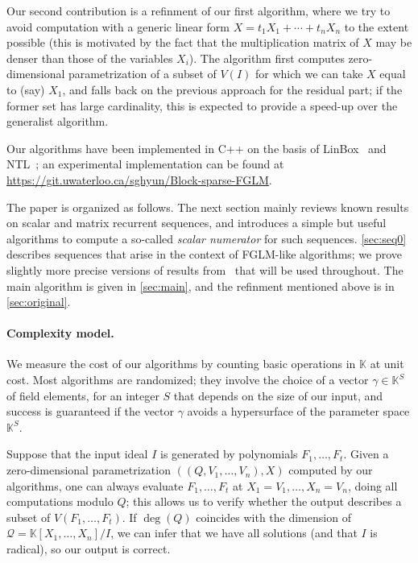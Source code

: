 \documentclass[12pt]{article}
\newcommand{\lf}{X}
\newcommand{\residueI}{\mathscr{Q}}
\newcommand{\sqfree}{Q}
\def\K{\mathbb{K}}
\def\K {\ensuremath{\mathbb{K}}}
\begin{document}
Our second contribution is a refinment of our first algorithm, where
we try to avoid computation with a generic linear form $\lf =t_1 X_1 +
\cdots + t_n X_n$ to the extent possible (this is motivated by the
fact that the multiplication matrix of $\lf$ may be denser than those
of the variables $X_i$). The algorithm first computes zero-dimensional
parametrization of a subset of $V(I)$ for which we can take $\lf$
equal to (say) $X_1$, and falls back on the previous approach for the
residual part; if the former set has large cardinality, this is
expected to provide a speed-up over the generalist algorithm.

Our algorithms have been implemented in C++ on the basis of
LinBox~\cite{LinBox} and NTL~\cite{NTL}; an experimental
implementation can be found at
\url{https://git.uwaterloo.ca/sghyun/Block-sparse-FGLM}.

The paper is organized as follows. The next section mainly reviews
known results on scalar and matrix recurrent sequences, and introduces
a simple but useful algorithms to compute a so-called {\em scalar
  numerator} for such sequences. \cref{sec:seq0} describes sequences
that arise in the context of FGLM-like algorithms; we prove slightly
more precise versions of results from~\cite{BoSaSc03} that will be 
used throughout. The main algorithm is given in \cref{sec:main},
and the refinment mentioned above is in \cref{sec:original}.


\paragraph{Complexity model.}
We measure the cost of our algorithms by counting basic operations in
$\K$ at unit cost. Most algorithms are randomized; they involve the
choice of a vector $\gamma \in \K^S$ of field elements, for an integer
$S$ that depends on the size of our input, and success is guaranteed
if the vector $\gamma$ avoids a hypersurface of the parameter space
$\K^S$.

Suppose that the input ideal $I$ is generated by polynomials
$F_1,\dots,F_t$.  Given a zero-dimensional parametrization
$((\sqfree,V_1,\dots,V_n),\lf)$ computed by our algorithms, one can
always evaluate $F_1,\dots,F_t$ at $X_1 =V_1,\dots,X_n=V_n$, doing all
computations modulo $\sqfree$; this allows us to verify whether the
output describes a subset of $V(F_1,\dots,F_t)$. If $\deg(Q)$
coincides with the dimension of $\residueI=\K[X_1,\dots,X_n]/I$, we
can infer that we have all solutions (and that $I$ is radical), so our
output is correct.
\end{document}
